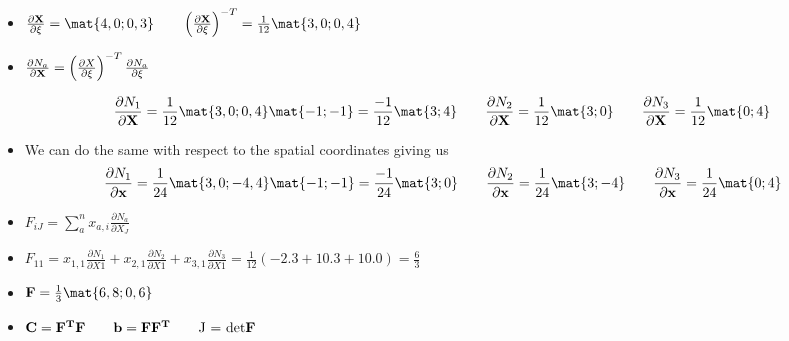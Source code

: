 	\begin{frame}
		\begin{itemize}
			\item $\frac{\partial \ve{X}}{\partial \xi} = \mat{4,0;0,3}\qquad  \left(\frac{\partial \ve{X}}{\partial \xi} \right)^{-T} = \frac{1}{12}\mat{3,0;0,4}$ 
			\item $\frac{\partial N_a}{\partial \mathbf{X}} = \left(\frac{\partial X}{\partial \mathbf{\xi}} \right)^{-T}\frac{\partial N_a}{\partial \mathbf{\xi}}$
			
			\begin{equation}
				\begin{aligned}
				\frac{\partial N_1}{\partial \ve{X}} = \frac{1}{12}\mat{3,0;0,4}\mat{-1;-1} = \frac{-1}{12}\mat{3;4} \qquad 	\frac{\partial N_2}{\partial \ve{X}}  = \frac{1}{12}\mat{3;0} \qquad \frac{\partial N_3}{\partial \ve{X}}  = \frac{1}{12}\mat{0;4}
				\end{aligned}
			\end{equation}
			 \item We can do the same with respect to the spatial coordinates giving us
			 			\begin{equation}
			 \begin{aligned}
			 \frac{\partial N_1}{\partial \ve{x}} = \frac{1}{24}\mat{3,0;-4,4}\mat{-1;-1} = \frac{-1}{24}\mat{3;0} \qquad 	\frac{\partial N_2}{\partial \ve{x}}  = \frac{1}{24}\mat{3;-4} \qquad \frac{\partial N_3}{\partial \ve{x}}  = \frac{1}{24}\mat{0;4}
			 \end{aligned}
			 \end{equation}
			 \item $F_{iJ} = \sum_{a}^{n} x_{a,i} \frac{\partial N_a}{\partial X_J} $
			 \item $F_{11} = x_{1,1}\frac{\partial N_1}{\partial X1} + x_{2,1}\frac{\partial N_2}{\partial X1} + x_{3,1}\frac{\partial N_3}{\partial X1} = \frac{1}{12}\left(-2.3 +10.3+10.0\right) =\frac{6}{3}$
			 \item $\ve{F} = \frac{1}{3}\mat{6,8;0,6}$
			 \item $\mathbf{C = F^TF \qquad b = FF^T \qquad \text{J = det}F}$
		\end{itemize}
	\end{frame}

